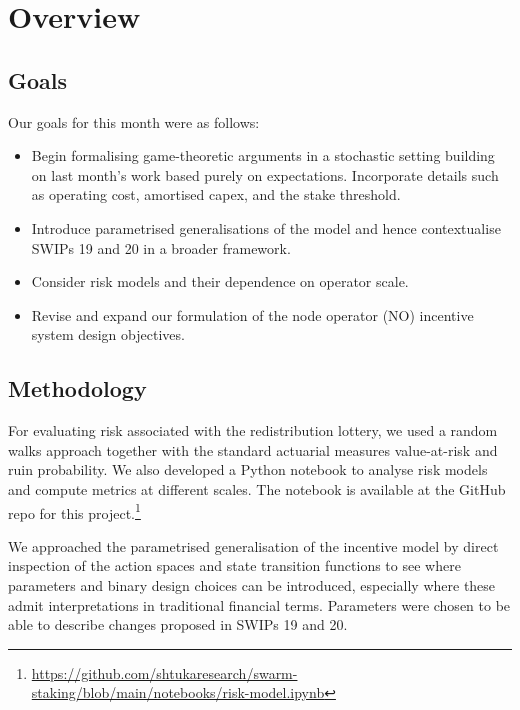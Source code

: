 \maketitle
\section*{Overview}

\subsection*{Goals}

Our goals for this month were as follows: 

\begin{itemize}
  \item 
    Begin formalising game-theoretic arguments in a stochastic setting building on last month's work based purely on expectations.
    Incorporate details such as operating cost, amortised capex, and the stake threshold.
  \item
    Introduce parametrised generalisations of the model and hence contextualise SWIPs 19 and 20 in a broader framework.
  \item 
    Consider risk models and their dependence on operator scale.
  \item
    Revise and expand our formulation of the node operator (NO) incentive system design objectives.
\end{itemize}

\subsection*{Methodology}

For evaluating risk associated with the redistribution lottery, we used a random walks approach together with the standard actuarial measures value-at-risk and ruin probability.
%
We also developed a Python notebook to analyse risk models and compute metrics at different scales. The notebook is available at the GitHub repo for this project.\footnote{\url{https://github.com/shtukaresearch/swarm-staking/blob/main/notebooks/risk-model.ipynb}}

We approached the parametrised generalisation of the incentive model by direct inspection of the action spaces and state transition functions to see where parameters and binary design choices can be introduced, especially where these admit interpretations in traditional financial terms. 
%
Parameters were chosen to be able to describe changes proposed in SWIPs 19 and 20.


